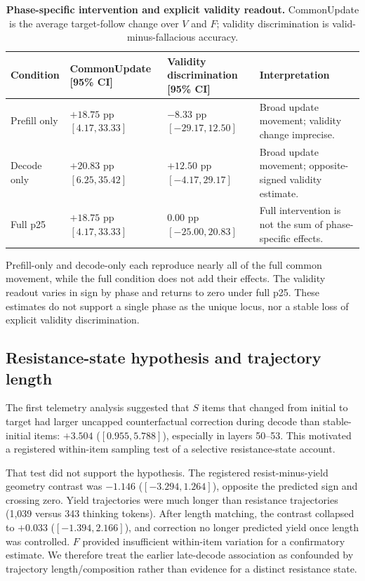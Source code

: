\documentclass[letterpaper]{article}
\begin{document}
\begin{table}[t]
\centering
\small
\begin{tabular}{lL{4.0cm}L{4.0cm}L{4.0cm}}
\toprule
Condition & CommonUpdate [95\% CI] & Validity discrimination [95\% CI] & Interpretation \\
\midrule
Prefill only & $+18.75$ pp $[4.17,33.33]$ & $-8.33$ pp $[-29.17,12.50]$ & Broad update movement; validity change imprecise. \\
Decode only & $+20.83$ pp $[6.25,35.42]$ & $+12.50$ pp $[-4.17,29.17]$ & Broad update movement; opposite-signed validity estimate. \\
Full p25 & $+18.75$ pp $[4.17,33.33]$ & $0.00$ pp $[-25.00,20.83]$ & Full intervention is not the sum of phase-specific effects. \\
\bottomrule
\end{tabular}
\caption{\textbf{Phase-specific intervention and explicit validity readout.} CommonUpdate is the average target-follow change over $V$ and $F$; validity discrimination is valid-minus-fallacious accuracy.}
\label{tab:supp-phase}
\end{table}

Prefill-only and decode-only each reproduce nearly all of the full common movement, while the full condition does not add their effects.  The validity readout varies in sign by phase and returns to zero under full p25.  These estimates do not support a single phase as the unique locus, nor a stable loss of explicit validity discrimination.

\subsection{Resistance-state hypothesis and trajectory length}

The first telemetry analysis suggested that $S$ items that changed from initial to target had larger uncapped counterfactual correction during decode than stable-initial items: $+3.504$ ($[0.955,5.788]$), especially in layers 50--53.  This motivated a registered within-item sampling test of a selective resistance-state account.

That test did not support the hypothesis.  The registered resist-minus-yield geometry contrast was $-1.146$ ($[-3.294,1.264]$), opposite the predicted sign and crossing zero.  Yield trajectories were much longer than resistance trajectories (1,039 versus 343 thinking tokens).  After length matching, the contrast collapsed to $+0.033$ ($[-1.394,2.166]$), and correction no longer predicted yield once length was controlled.  $F$ provided insufficient within-item variation for a confirmatory estimate.  We therefore treat the earlier late-decode association as confounded by trajectory length/composition rather than evidence for a distinct resistance state.
\end{document}
